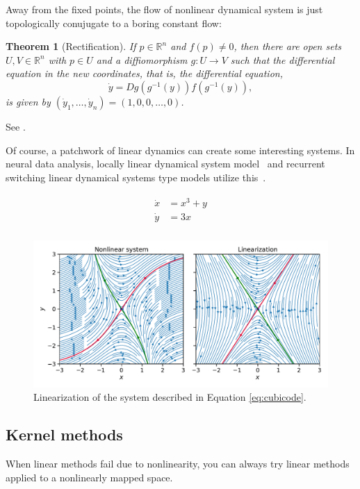 \documentclass[a4paper,11pt]{exam}
\newtheorem{theorem}{Theorem}
\newcounter{ct}
\newcommand{\inv}{^{-1}}
\newcommand{\field}[1]{\ensuremath{\mathbb{#1}}}
\newcommand{\reals}{\field{R}}
\begin{document}
\begin{questions}
Away from the fixed points, the flow of nonlinear dynamical system is just topologically conujugate to a boring constant flow:
\begin{theorem}[Rectification]
    If $p \in \reals^n$ and $f(p) \neq 0$, then there are open sets $U, V \in \reals^n$ with $p \in U$ and a diffiomorphism $g: U \to V$ such that the differential equation in the new coordinates, that is, the differential equation,
    $$ \dot{y} = Dg(g\inv(y)) f(g\inv(y)), $$
is given by $(\dot{y}_1, \ldots, \dot{y}_n) = (1, 0, 0, \ldots, 0)$.
\end{theorem}
See \citet[Lemma 1.120]{Chicone2006}.

Of course, a patchwork of linear dynamics can create some interesting systems.
In neural data analysis, locally linear dynamical system model~\cite{Zhao2016d} and recurrent switching linear dynamical systems type models utilize this~\citep{Linderman2017,Nassar2018b}.

\begin{align}\label{eq:cubicode}
\begin{split}
\dot x &= x^3 + y\\
\dot y &= 3x \\
\end{split}
\end{align}

\begin{figure}[h]
    \centering
    \includegraphics[width=\textwidth]{figs/linearization.pdf}
    \caption{Linearization of the system described in Equation \ref{eq:cubicode}.}
    \label{fig:linearization}
\end{figure}

\subsection{Kernel methods}
When linear methods fail due to nonlinearity, you can always try linear methods applied to a nonlinearly mapped space.


\end{questions}
\end{document}
